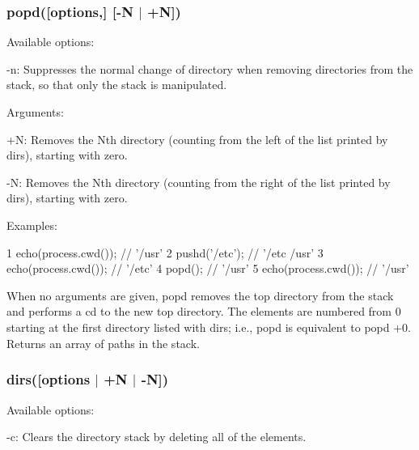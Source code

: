\subsubsection*{popd(\mbox{[}options,\mbox{]} \mbox{[}\textquotesingle{}-\/\+N\textquotesingle{} $\vert$ \textquotesingle{}+\+N\textquotesingle{}\mbox{]})}

Available options\+:


\begin{DoxyItemize}
\item {\ttfamily -\/n}\+: Suppresses the normal change of directory when removing directories from the stack, so that only the stack is manipulated.
\end{DoxyItemize}

Arguments\+:


\begin{DoxyItemize}
\item {\ttfamily +\+N}\+: Removes the Nth directory (counting from the left of the list printed by dirs), starting with zero.
\item {\ttfamily -\/\+N}\+: Removes the Nth directory (counting from the right of the list printed by dirs), starting with zero.
\end{DoxyItemize}

Examples\+:


\begin{DoxyCode}
1 echo(process.cwd()); // '/usr'
2 pushd('/etc');       // '/etc /usr'
3 echo(process.cwd()); // '/etc'
4 popd();              // '/usr'
5 echo(process.cwd()); // '/usr'
\end{DoxyCode}


When no arguments are given, popd removes the top directory from the stack and performs a cd to the new top directory. The elements are numbered from 0 starting at the first directory listed with dirs; i.\+e., popd is equivalent to popd +0. Returns an array of paths in the stack.

\subsubsection*{dirs(\mbox{[}options $\vert$ \textquotesingle{}+\+N\textquotesingle{} $\vert$ \textquotesingle{}-\/\+N\textquotesingle{}\mbox{]})}

Available options\+:


\begin{DoxyItemize}
\item {\ttfamily -\/c}\+: Clears the directory stack by deleting all of the elements.
\end{DoxyItemize}


